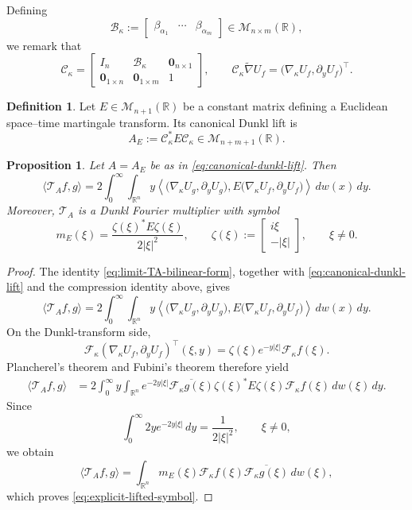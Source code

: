 \documentclass[11pt]{amsart}
\newtheorem{proposition}[theorem]{Proposition}
\theoremstyle{definition}
\newtheorem{definition}[theorem]{Definition}
\theoremstyle{remark}
\numberwithin{equation}{section}
\newcommand{\R}{\mathbb{R}}
\begin{document}
Defining
\[
\mathcal B_\kappa
:=\begin{bmatrix}\beta_{\alpha_1}&\cdots&\beta_{\alpha_m}\end{bmatrix}
\in\mathcal M_{n\times m}(\R),
\]
we remark that
\[
\mathcal C_\kappa
=
\begin{bmatrix}
I_n&\mathcal B_\kappa&\mathbf0_{n\times1}\\
\mathbf0_{1\times n}&\mathbf0_{1\times m}&1
\end{bmatrix},
\qquad
\mathcal C_\kappa\widetilde\nabla U_f
=\bigl(\nabla_\kappa U_f,\partial_yU_f\bigr)^\top.
\]

\begin{definition}
Let $E\in\mathcal M_{n+1}(\R)$ be a constant matrix defining a Euclidean space--time martingale transform. Its canonical Dunkl lift is
\begin{equation}
A_E:=\mathcal C_\kappa^*E\mathcal C_\kappa
\in\mathcal M_{n+m+1}(\R).
\label{eq:canonical-dunkl-lift}
\end{equation}
\end{definition}

\begin{proposition}
Let $A=A_E$ be as in \eqref{eq:canonical-dunkl-lift}. Then
\[
\langle\mathcal T_Af,g\rangle
=
2\int_0^\infty\int_{\R^n}
y\left\langle
\bigl(\nabla_\kappa U_g,\partial_yU_g\bigr),
E\bigl(\nabla_\kappa U_f,\partial_yU_f\bigr)
\right\rangle\,dw(x)\,dy.
\]
Moreover, $\mathcal T_A$ is a Dunkl Fourier multiplier with symbol
\begin{equation}
m_E(\xi)
=\frac{\zeta(\xi)^*E\zeta(\xi)}{2|\xi|^2},
\qquad
\zeta(\xi):=\begin{bmatrix}i\xi\\- |\xi|\end{bmatrix},
\qquad \xi\neq0.
\label{eq:explicit-lifted-symbol}
\end{equation}
\end{proposition}

\begin{proof}
The identity \eqref{eq:limit-TA-bilinear-form}, together with \eqref{eq:canonical-dunkl-lift} and the compression identity above, gives
\[
\langle\mathcal T_Af,g\rangle
=
2\int_0^\infty\int_{\R^n}
y\left\langle
\bigl(\nabla_\kappa U_g,\partial_yU_g\bigr),
E\bigl(\nabla_\kappa U_f,\partial_yU_f\bigr)
\right\rangle\,dw(x)\,dy.
\]
On the Dunkl-transform side,
\[
\mathcal F_\kappa\left(\nabla_\kappa U_f,\partial_yU_f\right)^\top(\xi,y)
=\zeta(\xi)e^{-y|\xi|}\mathcal F_\kappa f(\xi).
\]
Plancherel's theorem and Fubini's theorem therefore yield
\begin{align*}
\langle\mathcal T_Af,g\rangle
&=
2\int_0^\infty y\int_{\R^n}
e^{-2y|\xi|}\overline{\mathcal F_\kappa g(\xi)}
\zeta(\xi)^*E\zeta(\xi)\mathcal F_\kappa f(\xi)\,dw(\xi)\,dy.
\end{align*}
Since
\[
\int_0^\infty2ye^{-2y|\xi|}\,dy=\frac1{2|\xi|^2},
\qquad \xi\neq0,
\]
we obtain
\[
\langle\mathcal T_Af,g\rangle
=\int_{\R^n}m_E(\xi)\mathcal F_\kappa f(\xi)
\overline{\mathcal F_\kappa g(\xi)}\,dw(\xi),
\]
which proves \eqref{eq:explicit-lifted-symbol}.
\end{proof}
\end{document}
